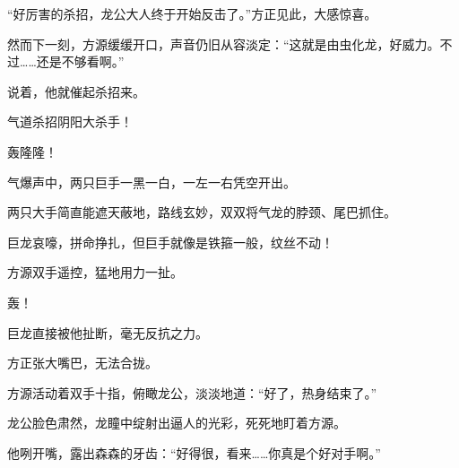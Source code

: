 \begin{this_body}
“好厉害的杀招，龙公大人终于开始反击了。”方正见此，大感惊喜。

然而下一刻，方源缓缓开口，声音仍旧从容淡定：“这就是由虫化龙，好威力。不过……还是不够看啊。”

说着，他就催起杀招来。

气道杀招阴阳大杀手！

轰隆隆！

气爆声中，两只巨手一黑一白，一左一右凭空开出。

两只大手简直能遮天蔽地，路线玄妙，双双将气龙的脖颈、尾巴抓住。

巨龙哀嚎，拼命挣扎，但巨手就像是铁箍一般，纹丝不动！

方源双手遥控，猛地用力一扯。

轰！

巨龙直接被他扯断，毫无反抗之力。

方正张大嘴巴，无法合拢。

方源活动着双手十指，俯瞰龙公，淡淡地道：“好了，热身结束了。”

龙公脸色肃然，龙瞳中绽射出逼人的光彩，死死地盯着方源。

他咧开嘴，露出森森的牙齿：“好得很，看来……你真是个好对手啊。”

\end{this_body}

